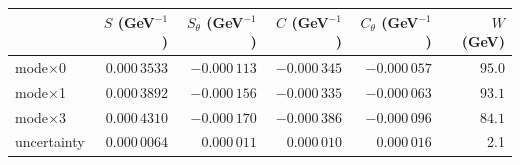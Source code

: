 \documentclass[compress]{beamer}
\begin{document}
\begin{frame}
\vfill
\hfill \begin{tabular}{l r r r r r}
& $S$ (GeV$^{-1}$) & $S_{\theta}$ (GeV$^{-1}$) & $C$ (GeV$^{-1}$) & $C_{\theta}$ (GeV$^{-1}$) & $W$ (GeV) \\\hline
mode$\times$0 & $0.000\,3533$ & $-0.000\,113$ & $-0.000\,345$ & $-0.000\,057$ & $95.0$ \\
mode$\times$1 & $0.000\,3892$ & $-0.000\,156$ & $-0.000\,335$ & $-0.000\,063$ & $93.1$ \\
mode$\times$3 & $0.000\,4310$ & $-0.000\,170$ & $-0.000\,386$ & $-0.000\,096$ & $84.1$ \\\hline
uncertainty & $0.000\,0064$ & $0.000\,011$ & $0.000\,010$ & $0.000\,016$ & 2.1 \\
\end{tabular}

\end{frame}
\end{document}

